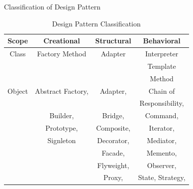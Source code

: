 \documentclass[13pt]{beamer}
\begin{document}
\begin{frame}{Classification of Design Pattern}
\begin{table}[h!]
  \begin{center}
    \caption{Design Pattern Classification}
    \begin{tabular}{|c|c|c|c|} %
		\hline      
      	\textbf{Scope} & \textbf{Creational} & \textbf{Structural} & \textbf{Behavioral}\\
		\hline	  	
	  	Class & Factory Method & Adapter & Interpreter \\
	  		& 				& 		  & Template\\
	  		&				&		  & Method\\    
      	\hline
      	Object & Abstract Factory, & Adapter, & Chain of\\ 
      		 &				   & 		 & Responsibility,\\
       		 & Builder, & Bridge, & Command,\\
       		 & Prototype, & Composite, & Iterator,\\
       		 & Signleton & Decorator, & Mediator,\\
       		 & 			 & Facade, & Memento,\\
       		 &			 & Flyweight, & Observer,\\
       		 &			 & Proxy, & State, Strategy,\\
      	\hline
    \end{tabular}
  \end{center}
\end{table}
\end{frame}
\end{document}
